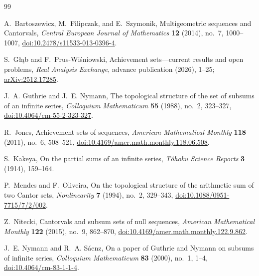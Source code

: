 \documentclass[11pt,letterpaper]{article}
\theoremstyle{metriqthm}
\theoremstyle{metriqdef}
\begin{document}
\clearpage
\begin{thebibliography}{99}
\small

A.~Bartoszewicz, M.~Filipczak, and E.~Szymonik,
\newblock Multigeometric sequences and Cantorvals,
\newblock \emph{Central European Journal of Mathematics} \textbf{12} (2014), no.~7, 1000--1007,
\newblock \href{https://doi.org/10.2478/s11533-013-0396-4}{doi:10.2478/s11533-013-0396-4}.

S.~Głąb and F.~Prus-Wiśniowski,
\newblock Achievement sets---current results and open problems,
\newblock \emph{Real Analysis Exchange}, advance publication (2026), 1--25;
\newblock \href{https://arxiv.org/abs/2512.17285}{arXiv:2512.17285}.

J.~A. Guthrie and J.~E. Nymann,
\newblock The topological structure of the set of subsums of an infinite series,
\newblock \emph{Colloquium Mathematicum} \textbf{55} (1988), no.~2, 323--327,
\newblock \href{https://doi.org/10.4064/cm-55-2-323-327}{doi:10.4064/cm-55-2-323-327}.

R.~Jones,
\newblock Achievement sets of sequences,
\newblock \emph{American Mathematical Monthly} \textbf{118} (2011), no.~6, 508--521,
\newblock \href{https://doi.org/10.4169/amer.math.monthly.118.06.508}{doi:10.4169/amer.math.monthly.118.06.508}.

S.~Kakeya,
\newblock On the partial sums of an infinite series,
\newblock \emph{T\^ohoku Science Reports} \textbf{3} (1914), 159--164.

P.~Mendes and F.~Oliveira,
\newblock On the topological structure of the arithmetic sum of two Cantor sets,
\newblock \emph{Nonlinearity} \textbf{7} (1994), no.~2, 329--343,
\newblock \href{https://doi.org/10.1088/0951-7715/7/2/002}{doi:10.1088/0951-7715/7/2/002}.

Z.~Nitecki,
\newblock Cantorvals and subsum sets of null sequences,
\newblock \emph{American Mathematical Monthly} \textbf{122} (2015), no.~9, 862--870,
\newblock \href{https://doi.org/10.4169/amer.math.monthly.122.9.862}{doi:10.4169/amer.math.monthly.122.9.862}.

J.~E. Nymann and R.~A. S\'aenz,
\newblock On a paper of Guthrie and Nymann on subsums of infinite series,
\newblock \emph{Colloquium Mathematicum} \textbf{83} (2000), no.~1, 1--4,
\newblock \href{https://doi.org/10.4064/cm-83-1-1-4}{doi:10.4064/cm-83-1-1-4}.

\end{thebibliography}
\end{document}
